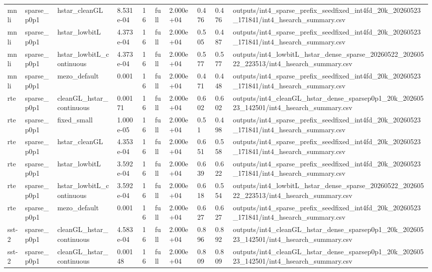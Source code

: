 \begin{table}[t]
\begin{tabular}{llllllllll}
mnli & sparse\_p0p1 & hstar\_cleanGL & 8.531e-04 & 16 & full & 2.000e+04 & 0.476 & 0.476 & outputs/int4\_sparse\_prefix\_seedfixed\_int4fd\_20k\_20260523\_171841/int4\_hsearch\_summary.csv \\
mnli & sparse\_p0p1 & hstar\_lowbitL & 4.373e-04 & 16 & full & 2.000e+04 & 0.505 & 0.487 & outputs/int4\_sparse\_prefix\_seedfixed\_int4fd\_20k\_20260523\_171841/int4\_hsearch\_summary.csv \\
mnli & sparse\_p0p1 & hstar\_lowbitL\_continuous & 4.373e-04 & 16 & full & 2.000e+04 & 0.577 & 0.577 & outputs/int4\_lowbitL\_hstar\_dense\_sparse\_20260522\_20260522\_223513/int4\_hsearch\_summary.csv \\
mnli & sparse\_p0p1 & mezo\_default & 0.001 & 16 & full & 2.000e+04 & 0.471 & 0.448 & outputs/int4\_sparse\_prefix\_seedfixed\_int4fd\_20k\_20260523\_171841/int4\_hsearch\_summary.csv \\
rte & sparse\_p0p1 & cleanGL\_hstar\_continuous & 0.00171 & 16 & full & 2.000e+04 & 0.602 & 0.602 & outputs/int4\_cleanGL\_hstar\_dense\_sparsep0p1\_20k\_20260523\_142501/int4\_hsearch\_summary.csv \\
rte & sparse\_p0p1 & fixed\_small & 1.000e-05 & 16 & full & 2.000e+04 & 0.51 & 0.498 & outputs/int4\_sparse\_prefix\_seedfixed\_int4fd\_20k\_20260523\_171841/int4\_hsearch\_summary.csv \\
rte & sparse\_p0p1 & hstar\_cleanGL & 4.353e-04 & 16 & full & 2.000e+04 & 0.651 & 0.558 & outputs/int4\_sparse\_prefix\_seedfixed\_int4fd\_20k\_20260523\_171841/int4\_hsearch\_summary.csv \\
rte & sparse\_p0p1 & hstar\_lowbitL & 3.592e-04 & 16 & full & 2.000e+04 & 0.639 & 0.622 & outputs/int4\_sparse\_prefix\_seedfixed\_int4fd\_20k\_20260523\_171841/int4\_hsearch\_summary.csv \\
rte & sparse\_p0p1 & hstar\_lowbitL\_continuous & 3.592e-04 & 16 & full & 2.000e+04 & 0.618 & 0.554 & outputs/int4\_lowbitL\_hstar\_dense\_sparse\_20260522\_20260522\_223513/int4\_hsearch\_summary.csv \\
rte & sparse\_p0p1 & mezo\_default & 0.001 & 16 & full & 2.000e+04 & 0.627 & 0.627 & outputs/int4\_sparse\_prefix\_seedfixed\_int4fd\_20k\_20260523\_171841/int4\_hsearch\_summary.csv \\
sst-2 & sparse\_p0p1 & cleanGL\_hstar\_continuous & 4.583e-04 & 16 & full & 2.000e+04 & 0.896 & 0.892 & outputs/int4\_cleanGL\_hstar\_dense\_sparsep0p1\_20k\_20260523\_142501/int4\_hsearch\_summary.csv \\
sst-2 & sparse\_p0p1 & cleanGL\_hstar\_continuous & 0.00148 & 16 & full & 2.000e+04 & 0.809 & 0.809 & outputs/int4\_cleanGL\_hstar\_dense\_sparsep0p1\_20k\_20260523\_142501/int4\_hsearch\_summary.csv \\

\end{tabular}
\end{table}
